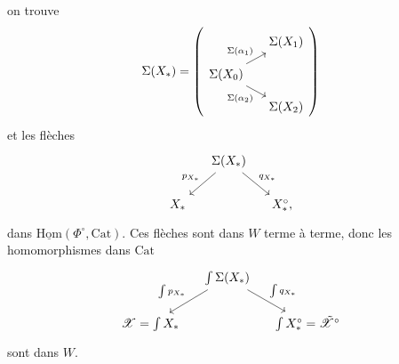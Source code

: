 \documentclass[11pt]{article}
\newcommand{\printedpage}[1]{\marginpar{\footnotesize p.~#1}}
\newcommand{\msp}[1]{\marginpar{\footnotesize [#1]}}
\newcommand{\Cat}{\mathrm{Cat}}
\newcommand{\sX}{\mathscr{X}}
\newcommand{\Hom}{\mathrm{Hom}}
\newcommand{\tsX}{\tilde{\mathscr{X}}}
\begin{document}
\msp{page 138}
on trouve
\[
\Sigma(X_*) =
\left(
\begin{tikzcd}[row sep=small, column sep=small]
 & \Sigma(X_1) \\
\Sigma(X_0) \arrow[ur, "\Sigma(\alpha_1)"] \arrow[dr, "\Sigma(\alpha_2)"'] & \\
 & \Sigma(X_2)
\end{tikzcd}
\right)
\]
et les flèches
\printedpage{94}
\[
\begin{tikzcd}[column sep=small]
 & \Sigma(X_*) \arrow[dl, "p_{X_*}"'] \arrow[dr, "q_{X_*}"] & \\
X_* & & X_*^\circ,
\end{tikzcd}
\]
dans $\underline{\Hom}(\Phi^\circ,\Cat)$. Ces flèches sont dans $W$ terme à terme, donc les homomorphismes dans $\Cat$
\[
\begin{tikzcd}[column sep=small]
 & \int\Sigma(X_*) \arrow[dl, "\int p_{X_*}"'] \arrow[dr, "\int q_{X_*}"] & \\
\sX=\int X_* & & \int X_*^\circ=\tsX^\circ
\end{tikzcd}
\]
sont dans $W$.
\end{document}
